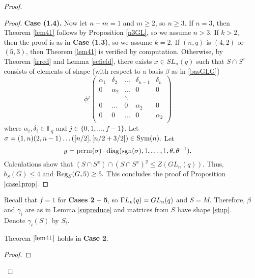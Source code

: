 \begin{proof}
\begin{proof}
{\bf Case (1.4).} Now let $n-m=1$  and $m \ge 2$,  so $n\ge 3.$ If $n=3$, then Theorem \ref{lem41} follows by Proposition \ref{n3GL}, so we assume $n>3.$
If $k>2$, then the proof is  as in  {\bf Case (1.3)}, so we assume $k=2.$
If $(n,q)$ is $(4,2)$ or $(5,3)$, then Theorem \ref{lem41} is verified by computation. 
 Otherwise,  by Theorem \ref{irred} and Lemma \ref{scfield}, there exists $x \in SL_n(q)$ such that $S \cap S^x$ consists of elements of  shape (with respect to a basis $\beta$ as in \eqref{basGLG})
\begin{equation*} 
\phi^j
  \begin{pmatrix}
\alpha_1 &\delta_2 & \dots    & \delta_{n-1} & \delta_n  \\
0 & \alpha_2 & \dots  & 0 & 0 \\
 &  & \ddots  &  &  \\
 0& \dots & 0  & \alpha_{2} & 0 \\
0 & 0 & \dots  & 0 & \alpha_2 \\
\end{pmatrix}
\end{equation*}
where $\alpha_i, \delta_i \in \mathbb{F}_q$ and $j \in \{0,1, \ldots, f-1\}.$
Let $\sigma =(1, n)(2, n - 1) \ldots ([n/2], [n/2 + 3/2]) \in \mathrm{Sym}(n).$ Let $$y = \mathrm{perm}(\sigma) \cdot \mathrm{diag}(\mathrm{sgn}(\sigma), 1, \ldots, 1, \theta, \theta^{-1}).$$ Calculations show that $(S \cap S^x) \cap (S \cap S^x)^y \le Z(GL_n(q)).$ Thus, $b_S(G)\le 4$ and $\mathrm{Reg}_{S}(G,5) \ge 5.$ This concludes the proof of Proposition \ref{case1prop}.
\end{proof}

\bigskip

Recall that $f=1$ for {\bf Cases 2 -- 5}, so ${{\Gamma L}}_n(q)=GL_n(q)$ and $S=M.$ Therefore, $\beta$ and $\gamma_i$ are as in Lemma \ref{supreduce} and matrices from $S$ have shape \eqref{stup}. Denote $\gamma_i(S)$ by $S_i$.



\begin{Prop}
\label{case2prop}
 Theorem $\ref{lem41}$ holds in {\bf Case 2}.
\end{Prop} 
\begin{proof}



\end{proof}
\end{proof}

